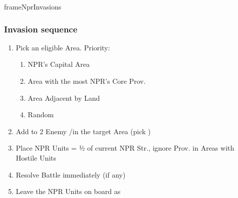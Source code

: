 \documentclass[10pt]{article}
\newlength{\fhNprInvasions} \setlength\fhNprInvasions{13\baselineskip}
\begin{document}
\begin{dynamiccontents*}{frameNprInvasions}
\begin{eubox}{\fhNprInvasions}
\begin{multicols}{2}
		\subsubsection*{Invasion sequence}
		\begin{enumerate}[label=\strong{\arabic*.}]
			\item Pick an eligible Area. Priority:
			\begin{enumerate}[label=\arabic*.]
				\item NPR's Capital Area
				\item Area with the most NPR's Core Prov.
				\item Area Adjacent by Land
				\item Random
			\end{enumerate}
			\item Add \unrest to 2 Enemy \towns/\vassals in the target Area (pick \az)
			\item Place NPR Units = ½ of current NPR Str., ignore Prov. in Areas with Hostile Units
			\item Resolve Battle immediately (if any)
			\begin{itemize}
			\end{itemize}
			\item Leave the NPR Units on board as \rebels
		\end{enumerate}
	\end{multicols}
\end{eubox}\end{dynamiccontents*}
\end{document}

